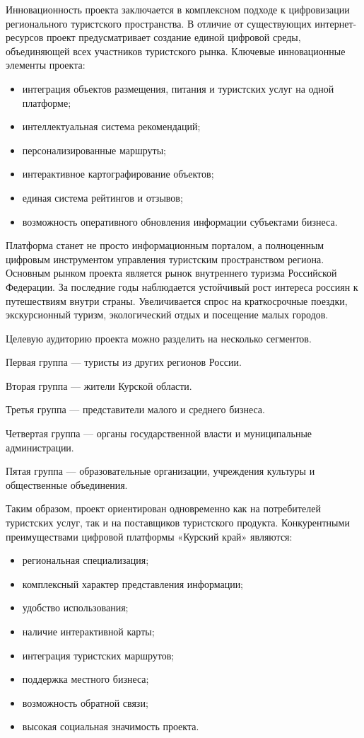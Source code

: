 Инновационность проекта заключается в комплексном подходе к цифровизации регионального туристского пространства. В отличие от существующих интернет-ресурсов проект предусматривает создание единой цифровой среды, объединяющей всех участников туристского рынка.
Ключевые инновационные элементы проекта:
\begin{itemize}
\item интеграция объектов размещения, питания и туристских услуг на одной платформе;
\item интеллектуальная система рекомендаций;
\item персонализированные маршруты;
\item интерактивное картографирование объектов;
\item единая система рейтингов и отзывов;
\item возможность оперативного обновления информации субъектами бизнеса.
\end{itemize}

Платформа станет не просто информационным порталом, а полноценным цифровым инструментом управления туристским пространством региона.
Основным рынком проекта является рынок внутреннего туризма Российской Федерации. За последние годы наблюдается устойчивый рост интереса россиян к путешествиям внутри страны. Увеличивается спрос на краткосрочные поездки, экскурсионный туризм, экологический отдых и посещение малых городов.

Целевую аудиторию проекта можно разделить на несколько сегментов.

Первая группа — туристы из других регионов России.

Вторая группа — жители Курской области.

Третья группа — представители малого и среднего бизнеса.

Четвертая группа — органы государственной власти и муниципальные администрации.

Пятая группа — образовательные организации, учреждения культуры и общественные объединения.

Таким образом, проект ориентирован одновременно как на потребителей туристских услуг, так и на поставщиков туристского продукта.
Конкурентными преимуществами цифровой платформы «Курский край» являются:
\begin{itemize}
\item региональная специализация;
\item комплексный характер представления информации;
\item удобство использования;
\item наличие интерактивной карты;
\item интеграция туристских маршрутов;
\item поддержка местного бизнеса;
\item возможность обратной связи;
\item высокая социальная значимость проекта.
\end{itemize}

